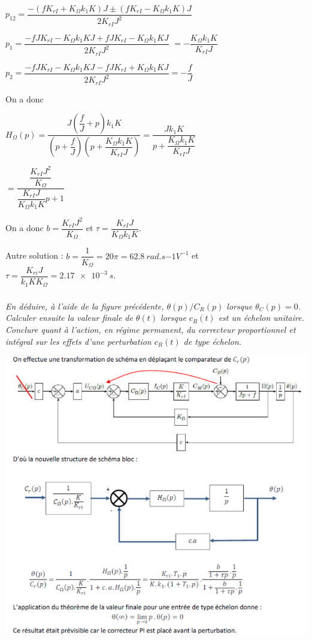 \documentclass[10pt,fleqn]{article} %
\begin{document}
\begin{multicols}{2}
\begin{corrige}
$p_{12} = \dfrac{-\left(f K_{rI}+K_{\Omega}k_{1}K\right)J \pm \left(f K_{rI}-K_{\Omega}k_{1}K\right)J}{2 K_{rI}J^2}$

$p_{1} = \dfrac{-fJ K_{rI}-K_{\Omega}k_{1}KJ + fJ K_{rI}-K_{\Omega}k_{1}KJ}{2 K_{rI}J^2}$
$= -\dfrac{K_{\Omega}k_{1}K }{ K_{rI}J}$


$p_{2} = \dfrac{-fJ K_{rI}-K_{\Omega}k_{1}KJ -fJ K_{rI}+K_{\Omega}k_{1}KJ}{2 K_{rI}J^2}= -\dfrac{f }{J}$

On a donc 

$H_{\Omega}(p)=\dfrac{J\left( \dfrac{f}{J} + p \right)k_{1}K}{\left(p+\dfrac{f }{J} \right)\left(p+\dfrac{K_{\Omega}k_{1}K }{ K_{rI}J} \right)}=\dfrac{Jk_{1}K}{p+\dfrac{K_{\Omega}k_{1}K }{ K_{rI}J} }$

$=\dfrac{\dfrac{ K_{rI}J^2}{K_{\Omega} } }{\dfrac{ K_{rI}J}{K_{\Omega}k_{1}K }p+1 }$

On a donc $b=\dfrac{ K_{rI}J^2}{K_{\Omega} }$ et $\tau =\dfrac{ K_{rI}J}{K_{\Omega}k_{1}K }$.

\normalsize
Autre solution : $b=\dfrac{1}{K_{\Omega}} = 20 \pi = \SI{62,8}{rad.s{-1}V^{-1}}$ et $\tau=\dfrac{K_{ri}J}{k_1KK_{\Omega}}=\SI{2,17e-3}{s}$.


\end{corrige}
\else
\fi

\subparagraph{}\textit{En déduire, à l'aide de la figure précédente, $\theta(p)/C_R(p)$
  lorsque $\theta_C(p)=0$. Calculer ensuite la valeur finale
  de $\theta(t)$ lorsque $c_R(t)$ est un échelon unitaire. %
  Conclure quant à l'action, en régime permanent, du correcteur
  proportionnel et intégral sur les effets d'une perturbation
  $c_R(t)$ de type échelon.}

\ifprof
\begin{corrige}
\begin{center}
\includegraphics[width=\linewidth]{images/cor_01.png}
\end{center}


\end{corrige}
\end{multicols}
\end{document}

